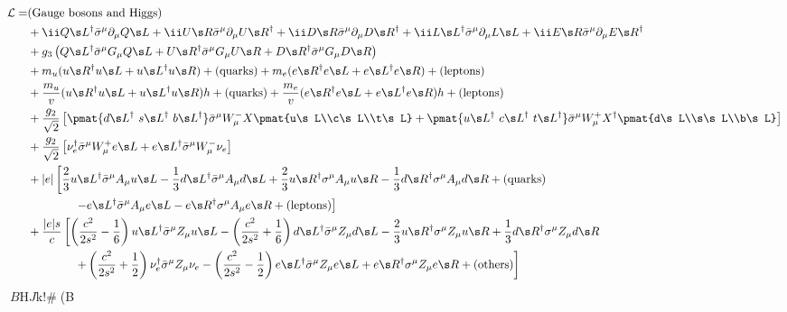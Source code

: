 \begin{align}
 \Lag =
& \text{(Gauge bosons and Higgs)}\notag\\
&
+ \ii Q\s L^\dagger\bar\sigma^\mu\partial_\mu Q\s L
+ \ii U\s R        \bar\sigma^\mu\partial_\mu U\s R^\dagger
+ \ii D\s R        \bar\sigma^\mu\partial_\mu D\s R^\dagger
+ \ii L\s L^\dagger\bar\sigma^\mu\partial_\mu L\s L
+ \ii E\s R        \bar\sigma^\mu\partial_\mu E\s R^\dagger \notag\\
&
+ g_3\left(
 Q\s L^\dagger\bar\sigma^\mu G_\mu Q\s L
+U\s R^\dagger\bar\sigma^\mu G_\mu U\s R
+D\s R^\dagger\bar\sigma^\mu G_\mu D\s R
\right)\notag\\
&
+m_u(u\s R^\dagger u\s L+u\s L^\dagger u\s R)+\text{(quarks)}
+m_e(e\s R^\dagger e\s L+e\s L^\dagger e\s R)+\text{(leptons)}
\notag\\&
+\frac{m_u}v(u\s R^\dagger u\s L+u\s L^\dagger u\s R)h + \text{(quarks)}
+\frac{m_e}v(e\s R^\dagger e\s L+e\s L^\dagger e\s R)h + \text{(leptons)}
\notag\\
&+
\frac{g_2}{\sqrt2}\left[
\pmat{d\s L^\dagger\ s\s L^\dagger\ b\s L^\dagger}
\bar\sigma^\mu W^-_\mu X \pmat{u\s L\\c\s L\\t\s L}
+
\pmat{u\s L^\dagger\ c\s L^\dagger\ t\s L^\dagger}
\bar\sigma^\mu W^+_\mu X^\dagger \pmat{d\s L\\s\s L\\b\s L}
\right]
\notag\\&
+\frac{g_2}{\sqrt2}\left[
\nu_e^\dagger\bar\sigma^\mu W^+_\mu e\s L + e\s L^\dagger\bar\sigma^\mu W^-_\mu \nu_e
\right]\notag\\
&
+|e|\left[
  \frac23 u\s L^\dagger \bar\sigma^\mu A_\mu u\s L
- \frac13 d\s L^\dagger \bar\sigma^\mu A_\mu d\s L
+ \frac23 u\s R^\dagger     \sigma^\mu A_\mu u\s R
- \frac13 d\s R^\dagger     \sigma^\mu A_\mu d\s R
+ \text{(quarks)}
\right.\notag\\&\left.\qquad\qquad
- e\s L^\dagger \bar\sigma^\mu A_\mu e\s L
- e\s R^\dagger     \sigma^\mu A_\mu e\s R
+ \text{(leptons)}\right]\notag\\
&%
+\frac{|e|s}{c}\left[
  \left(\frac{c^2}{2s^2}-\frac16\right)u\s L^\dagger \bar\sigma^\mu Z_\mu u\s L
- \left(\frac{c^2}{2s^2}+\frac16\right)d\s L^\dagger \bar\sigma^\mu Z_\mu d\s L
- \frac23 u\s R^\dagger     \sigma^\mu Z_\mu u\s R
+ \frac13 d\s R^\dagger     \sigma^\mu Z_\mu d\s R
\right.\notag\\&\left.\qquad\qquad
+ \left(\frac{c^2}{2s^2}+\frac12\right)\nu_e^\dagger \bar\sigma^\mu Z_\mu \nu_e
- \left(\frac{c^2}{2s^2}-\frac12\right)e\s L^\dagger \bar\sigma^\mu Z_\mu e\s L
+ e\s R^\dagger     \sigma^\mu Z_\mu e\s R
+ \text{(others)}\right]
\end{align}
$B$H$J$k!#(B

